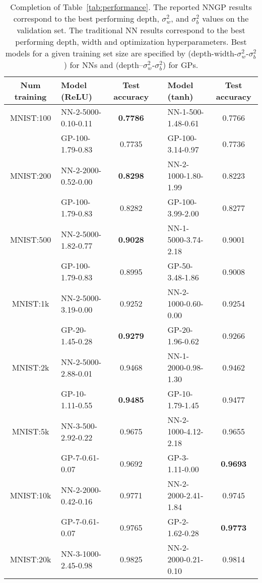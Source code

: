 \documentclass{article} %
\begin{document}
\begin{appendix}
\begin{table}[t!]  
  \caption{Completion of Table~\ref{tab:performance}.
    The reported NNGP results correspond to the best performing depth, $\sigma_w^2$, and $\sigma_b^2$ values on the validation set. The traditional NN results correspond to the best performing depth, width and optimization hyperparameters. Best models for a given training set size are specified by (depth-width-$\sigma_w^2$-$\sigma_b^2$) for NNs and (depth--$\sigma_w^2$-$\sigma_b^2$) for GPs.}\label{tab:appendix_results}
  \begin{tabular}{c|lc|clc}
        \hline
        Num training     & Model (ReLU)    & Test accuracy &   &Model (tanh)    & Test accuracy \\
        \hline 
        \hline 
        MNIST:100 & NN-2-5000-0.10-0.11 &\bf{ 0.7786 }&& NN-1-500-1.48-0.61 &0.7766\\ 
        & GP-100-1.79-0.83& 0.7735&& GP-100-3.14-0.97& 0.7736\\ 
        \hline 
        MNIST:200 & NN-2-2000-0.52-0.00 &\bf{ 0.8298 }&& NN-2-1000-1.80-1.99 &0.8223\\ 
        & GP-100-1.79-0.83& 0.8282&& GP-100-3.99-2.00& 0.8277\\ 
        \hline 
        MNIST:500 & NN-2-5000-1.82-0.77 &\bf{ 0.9028 }&& NN-1-5000-3.74-2.18 &0.9001\\ 
        & GP-100-1.79-0.83& 0.8995&& GP-50-3.48-1.86& 0.9008\\ 
        \hline 
        MNIST:1k & NN-2-5000-3.19-0.00 &0.9252&& NN-2-1000-0.60-0.00 &0.9254\\ 
        & GP-20-1.45-0.28& \bf{ 0.9279 }&& GP-20-1.96-0.62& 0.9266\\ 
        \hline 
        MNIST:2k & NN-2-5000-2.88-0.01 &0.9468&& NN-1-2000-0.98-1.30 &0.9462\\ 
        & GP-10-1.11-0.55& \bf{ 0.9485 }&& GP-10-1.79-1.45& 0.9477\\ 
        \hline 
        MNIST:5k & NN-3-500-2.92-0.22 &0.9675&& NN-2-1000-4.12-2.18 &0.9655\\ 
        & GP-7-0.61-0.07& 0.9692&& GP-3-1.11-0.00& \bf{ 0.9693 }\\ 
        \hline 
        MNIST:10k & NN-2-2000-0.42-0.16 &0.9771&& NN-2-2000-2.41-1.84 &0.9745\\ 
        & GP-7-0.61-0.07& 0.9765&& GP-2-1.62-0.28& \bf{ 0.9773 }\\ 
        \hline 
        MNIST:20k & NN-3-1000-2.45-0.98 &0.9825&& NN-2-2000-0.21-0.10 &0.9814\\ 

\end{tabular}
\end{table}
\end{appendix}
\end{document}
